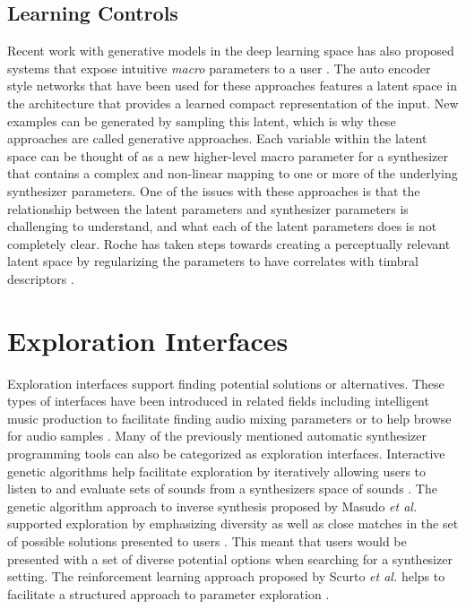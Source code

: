 \subsection{Learning Controls}
Recent work with generative models in the deep learning space has also proposed systems that expose intuitive \textit{macro} parameters to a user \cite{esling2020flow, roche2021make, le2021improving}. The auto encoder style networks that have been used for these approaches features a latent space in the architecture that provides a learned compact representation of the input. New examples can be generated by sampling this latent, which is why these approaches are called generative approaches. Each variable within the latent space can be thought of as a new higher-level macro parameter for a synthesizer that contains a complex and non-linear mapping to one or more of the underlying synthesizer parameters. One of the issues with these approaches is that the relationship between the latent parameters and synthesizer parameters is challenging to understand, and what each of the latent parameters does is not completely clear. Roche has taken steps towards creating a perceptually relevant latent space by regularizing the parameters to have correlates with timbral descriptors \cite{roche2021make}.

\section{Exploration Interfaces}
Exploration interfaces support finding potential solutions or alternatives. These types of interfaces have been introduced in related fields including intelligent music production to facilitate finding audio mixing parameters \cite{cartwright2014mixploration} or to help browse for audio samples \cite{fried2014audioquilt, shier2021manifold, turquois2016exploring}. Many of the previously mentioned automatic synthesizer programming tools can also be categorized as exploration interfaces. Interactive genetic algorithms help facilitate exploration by iteratively allowing users to listen to and evaluate sets of sounds from a synthesizers space of sounds \cite{johnson1999exploring, dahlstedt2001creating, yee2016use}. The genetic algorithm approach to inverse synthesis proposed by Masudo \textit{et al.} supported exploration by emphasizing diversity as well as close matches in the set of possible solutions presented to users \cite{masudo2021quality}. This meant that users would be presented with a set of diverse potential options when searching for a synthesizer setting. The reinforcement learning approach proposed by Scurto \textit{et al.} helps to facilitate a structured approach to parameter exploration \cite{scurto2021designing}. 

